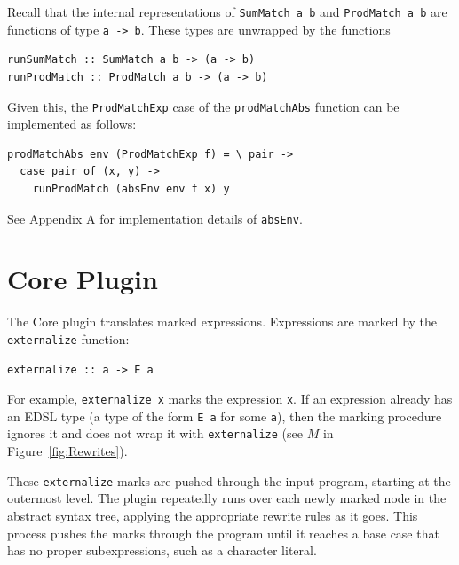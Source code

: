 \documentclass[runningheads, a4paper]{llncs}
\newcommand{\ttt}{\texttt}
\begin{document}
\noindent Recall that the internal representations of \verb|SumMatch a b| and \verb|ProdMatch a b|
are functions of type \verb|a -> b|. These types are unwrapped by the functions

\begin{lstlisting}
runSumMatch :: SumMatch a b -> (a -> b)
runProdMatch :: ProdMatch a b -> (a -> b)
\end{lstlisting}

\noindent Given this, the \verb|ProdMatchExp| case of the \verb|prodMatchAbs| function can be
implemented as follows:

\begin{lstlisting}
prodMatchAbs env (ProdMatchExp f) = \ pair ->
  case pair of (x, y) ->
    runProdMatch (absEnv env f x) y
\end{lstlisting}

\noindent See Appendix A for implementation details of \ttt{absEnv}.



\section{Core Plugin}
\label{sec:CorePlugin}

The Core plugin translates marked expressions. Expressions are marked by
the \ttt{externalize} function:

\begin{lstlisting}
externalize :: a -> E a
\end{lstlisting}

\noindent For example, \ttt{externalize x} marks the expression \ttt{x}.  If an expression
already has an EDSL type (a type of the form \ttt{E a} for some \ttt{a}), then
the marking procedure ignores it and does not wrap it with \ttt{externalize}
(see $M$ in Figure~\ref{fig:Rewrites}).

These \verb|externalize| marks are pushed through the input program, starting at
the outermost level. The plugin repeatedly runs over each newly marked node in
the abstract syntax tree, applying the appropriate rewrite rules as it goes.
This process pushes the marks through the program until it reaches a base case
that has no proper subexpressions, such as a character literal.
\end{document}
